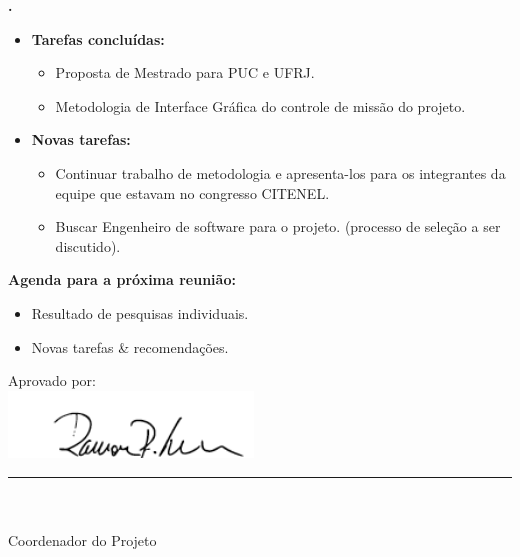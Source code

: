 			
   \textbf{\Julia.} 
	\begin{itemize}
		\item \textbf{Tarefas concluídas:}
			\begin{itemize}    
				\item Proposta de Mestrado para PUC e UFRJ.
				\item Metodologia de Interface Gráfica do controle de missão do projeto.
			\end{itemize}
		
		\item \textbf{Novas tarefas:}
			\begin{itemize} 
			    \item Continuar trabalho de metodologia e apresenta-los para os
			    integrantes da equipe que estavam no congresso CITENEL.
			    \item Buscar Engenheiro de software para o projeto. (processo de
			    seleção a ser discutido).
			\end{itemize}
	\end{itemize}		



\textbf{Agenda para a próxima reunião:}
  \begin{itemize}
    \item Resultado de pesquisas individuais.
    \item Novas tarefas \& recomendações.
  \end{itemize}


\vspace{5mm}%
\parbox[t]{70mm}{
  Aprovado por: \\[5mm]
  \centering
  \includegraphics[width=65mm]{figs/logo/assinatura-ramon.png} \\[-4mm]
  \rule[2mm]{70mm}{0.1mm} \\
  \ramon \\[1mm]
  Coordenador do Projeto \\
}

\fim